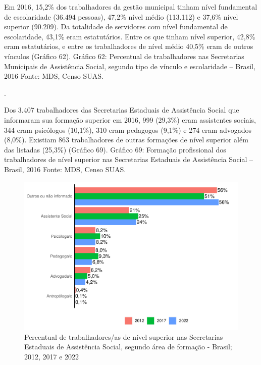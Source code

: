 \documentclass[
  brazilian]{report}
\begin{document}
Em 2016, 15,2\% dos trabalhadores da gestão municipal tinham nível
fundamental de escolaridade (36.494 pessoas), 47,2\% nível médio
(113.112) e 37,6\% nível superior (90.209). Da totalidade de servidores
com nível fundamental de escolaridade, 43,1\% eram estatutários. Entre
os que tinham nível superior, 42,8\% eram estatutários, e entre os
trabalhadores de nível médio 40,5\% eram de outros vínculos (Gráfico
62). Gráfico 62: Percentual de trabalhadores nas Secretarias Municipais
de Assistência Social, segundo tipo de vínculo e escolaridade -- Brasil,
2016 Fonte: MDS, Censo SUAS.

.

Dos 3.407 trabalhadores das Secretarias Estaduais de Assistência Social
que informaram sua formação superior em 2016, 999 (29,3\%) eram
assistentes sociais, 344 eram psicólogos (10,1\%), 310 eram pedagogos
(9,1\%) e 274 eram advogados (8,0\%). Existiam 863 trabalhadores de
outras formações de nível superior além das listadas (25,3\%) (Gráfico
69). Gráfico 69: Formação profissional dos trabalhadores de nível
superior nas Secretarias Estaduais de Assistência Social -- Brasil, 2016
Fonte: MDS, Censo SUAS.

\begin{figure}
\includegraphics{Censo-SUAS-2022_files/figure-latex/uf_trab_prof-1} \caption[Percentual de trabalhadores/as de nível superior nas Secretarias Estaduais de Assistência Social, segundo área de formação - Brasil]{Percentual de trabalhadores/as de nível superior nas Secretarias Estaduais de Assistência Social, segundo área de formação - Brasil; 2012, 2017 e 2022}\label{fig:uf_trab_prof}
\end{figure}
\end{document}
